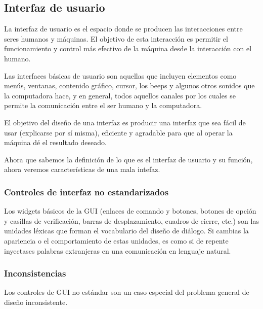 \subsection{Interfaz de usuario}
	\par 
		La interfaz de usuario es el espacio donde se producen las interacciones entre seres humanos y máquinas. El objetivo de esta interacción es permitir el funcionamiento y control más efectivo de la máquina desde la interacción con el humano.
		
	\par \noindent
		Las interfaces básicas de usuario son aquellas que incluyen elementos como menús, ventanas, contenido gráfico, cursor, los beeps y algunos otros sonidos que la computadora hace, y en general, todos aquellos canales por los cuales se permite la comunicación entre el ser humano y la computadora.
		
	\par \noindent
		El objetivo del diseño de una interfaz es producir una interfaz que sea fácil de usar (explicarse por sí misma), eficiente y agradable para que al operar la máquina dé el resultado deseado.
		
	\par \noindent
		Ahora que sabemos la definición de lo que es el interfaz de usuario y su función, ahora veremos características de una mala intefaz.
		
	\subsubsection{Controles de interfaz no estandarizados} 
		\par 
			Los widgets básicos de la GUI (enlaces de comando y botones, botones de opción y casillas de verificación, barras de desplazamiento, cuadros de cierre, etc.) son las unidades léxicas que forman el vocabulario del diseño de diálogo. Si cambias la apariencia o el comportamiento de estas unidades, es como si de repente inyectases palabras extranjeras en una comunicación en lenguaje natural.
			
\clearpage
\thispagestyle{plain}
			
	\subsubsection{Inconsistencias}
		\par 
			Los controles de GUI no estándar son un caso especial del problema general de diseño inconsistente.
			
